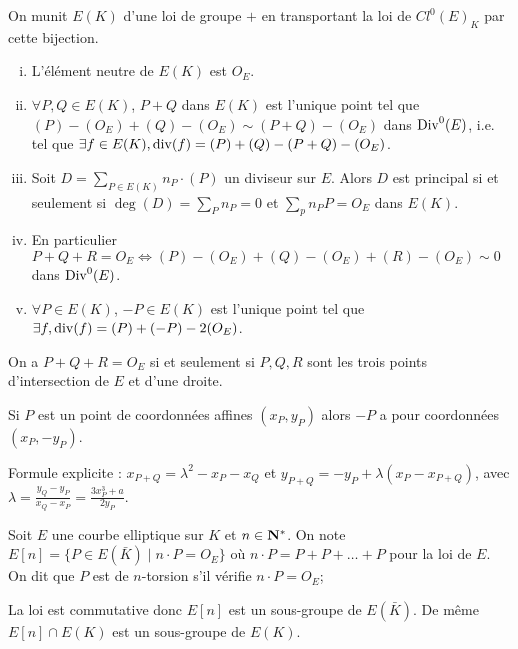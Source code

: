 	\begin{defn}
		On munit $E(K)$ d'une loi de groupe $+$ en transportant la loi de $Cl^0 (E)_K$ par cette bijection.
	\end{defn}
	
	\begin{pop}
		\begin{enumerate}[(i)]
			\item L'élément neutre de $E(K)$ est $O_E$.
			\item $\forall P,Q \in E(K)$, $P + Q$ dans $E(K)$ est l'unique point tel que $(P) - (O_E) + (Q) - (O_E) \sim (P + Q) - (O_E)$ dans $\operatorname{Div}^0(E)$, i.e. tel que $\exists f \in E(K), \operatorname{div}(f) = (P) + (Q) - (P + Q) - (O_E)$.
			\item Soit $D = \sum_{P \in E(K)} n_P \cdot (P)$ un diviseur sur $E$.
				Alors $D$ est principal si et seulement si $\deg(D) = \sum_P n_P = 0$ et $\sum_p n_P P = O_E$ dans $E(K)$.
			\item En particulier $P + Q + R = O_E \iff (P) - (O_E) + (Q) - (O_E) + (R) - (O_E) \sim 0$ dans $\operatorname{Div}^0(E)$.
			\item $\forall P \in E(K)$, $-P \in E(K)$ est l'unique point tel que $\exists f, \operatorname{div}(f) = (P) + (-P) - 2 (O_E)$.
		\end{enumerate}
	\end{pop}
	
	\begin{rem}
		On a $P + Q + R = O_E$ si et seulement si $P,Q,R$ sont les trois points d'intersection de $E$ et d'une droite.
	\end{rem}
	
	\begin{rem}
		Si $P$ est un point de coordonnées affines $(x_P,y_P)$ alors $-P$ a pour coordonnées $(x_P,-y_P)$.
	\end{rem}
	
	Formule explicite : $x_{P + Q} = \lambda^2 - x_P - x_Q$ et $y_{P + Q} = -y_P + \lambda (x_P - x_{P + Q})$, avec $\lambda = \frac{y_Q - y_P}{x_Q - x_P} = \frac{3 x_P^3 + a}{2 y_P}$.
	
	\begin{defn}
		Soit $E$ une courbe elliptique sur $K$ et $n \in \mathbf{N}^*$.
		On note $E[n] = \{ P \in E(\bar{K}) \mid n \cdot P = O_E \}$ où $n \cdot P = P + P + \ldots + P$ pour la loi de $E$.
		On dit que $P$ est de $n$-torsion s'il vérifie $n \cdot P = O_E$;
	\end{defn}
	
	\begin{rem}
		La loi est commutative donc $E[n]$ est un sous-groupe de $E(\bar K)$.
		De même $E[n] \cap E(K)$ est un sous-groupe de $E(K)$.
	\end{rem}
	
